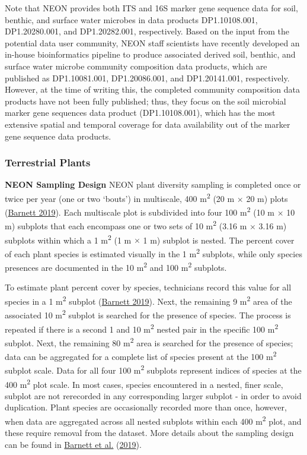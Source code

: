 \documentclass[
  12pt,
]{article}
\begin{document}
Note that NEON provides both ITS and 16S marker gene sequence data for soil, benthic, and surface water microbes in data products DP1.10108.001, DP1.20280.001, and DP1.20282.001, respectively. Based on the input from the potential data user community, NEON staff scientists have recently developed an in-house bioinformatics pipeline to produce associated derived soil, benthic, and surface water microbe community composition data products, which are published as DP1.10081.001, DP1.20086.001, and DP1.20141.001, respectively. However, at the time of writing this, the completed community composition data products have not been fully published; thus, they focus on the soil microbial marker gene sequences data product (DP1.10108.001), which has the most extensive spatial and temporal coverage for data availability out of the marker gene sequence data products.

\hypertarget{terrestrial-plants}{%
\subsubsection{Terrestrial Plants}\label{terrestrial-plants}}

\textbf{NEON Sampling Design} NEON plant diversity sampling is completed once or twice per year (one or two `bouts') in multiscale, 400 m\textsuperscript{2} (20 m \(\times\) 20 m) plots (\protect\hyperlink{ref-Barnett2019}{Barnett 2019}). Each multiscale plot is subdivided into four 100 m\textsuperscript{2} (10 m \(\times\) 10 m) subplots that each encompass one or two sets of 10 m\textsuperscript{2} (3.16 m \(\times\) 3.16 m) subplots within which a 1 m\textsuperscript{2} (1 m \(\times\) 1 m) subplot is nested. The percent cover of each plant species is estimated visually in the 1 m\textsuperscript{2} subplots, while only species presences are documented in the 10 m\textsuperscript{2} and 100 m\textsuperscript{2} subplots.

To estimate plant percent cover by species, technicians record this value for all species in a 1 m\textsuperscript{2} subplot (\protect\hyperlink{ref-Barnett2019}{Barnett 2019}). Next, the remaining 9 m\textsuperscript{2} area of the associated 10 m\textsuperscript{2} subplot is searched for the presence of species. The process is repeated if there is a second 1 and 10 m\textsuperscript{2} nested pair in the specific 100 m\textsuperscript{2} subplot. Next, the remaining 80 m\textsuperscript{2} area is searched for the presence of species; data can be aggregated for a complete list of species present at the 100 m\textsuperscript{2} subplot scale. Data for all four 100 m\textsuperscript{2} subplots represent indices of species at the 400 m\textsuperscript{2} plot scale. In most cases, species encountered in a nested, finer scale, subplot are not rerecorded in any corresponding larger subplot - in order to avoid duplication. Plant species are occasionally recorded more than once, however, when data are aggregated across all nested subplots within each 400 m\textsuperscript{2} plot, and these require removal from the dataset. More details about the sampling design can be found in \protect\hyperlink{ref-barnett2019plant}{Barnett et al.} (\protect\hyperlink{ref-barnett2019plant}{2019}).
\end{document}
